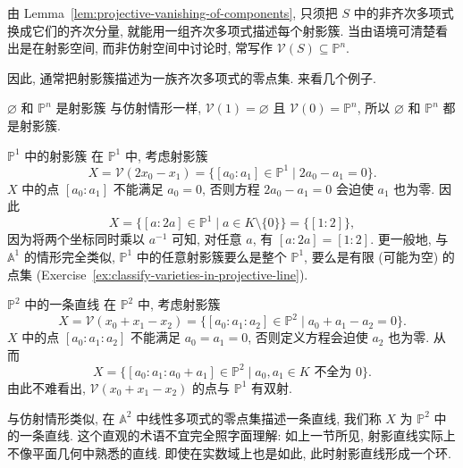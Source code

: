 \begin{BookFlowNote}[l]{%
由 Lemma~\ref{lem:projective-vanishing-of-components}, 只须把 $S$ 中的非齐次多项式换成它们的齐次分量, 就能用一组齐次多项式描述每个射影簇.
}
\noindent 当由语境可清楚看出是在射影空间, 而非仿射空间中讨论时, 常写作 $\mathcal{V}(S)\subseteq\mathbb{P}^{n}$.

因此, 通常把射影簇描述为一族齐次多项式的零点集. 来看几个例子.
\end{BookFlowNote}

\begin{Example}{$\varnothing$ 和 $\mathbb{P}^{n}$ 是射影簇}\leavevmode\label{ex:empty-set-and-projective-space-are-projective-varieties}
与仿射情形一样, $\mathcal{V}(1)=\varnothing$ 且 $\mathcal{V}(0)=\mathbb{P}^{n}$, 所以 $\varnothing$ 和 $\mathbb{P}^{n}$ 都是射影簇.
\end{Example}

\begin{Example}{$\mathbb{P}^{1}$ 中的射影簇}\leavevmode\label{ex:projective-varieties-in-projective-line}
在 $\mathbb{P}^{1}$ 中, 考虑射影簇
\[
  X=\mathcal{V}(2x_{0}-x_{1})
   =\{[a_{0}:a_{1}]\in\mathbb{P}^{1}\mid 2a_{0}-a_{1}=0\}.
\]
$X$ 中的点 $[a_{0}:a_{1}]$ 不能满足 $a_{0}=0$, 否则方程 $2a_{0}-a_{1}=0$ 会迫使 $a_{1}$ 也为零. 因此
\[
  X=\{[a:2a]\in\mathbb{P}^{1}\mid a\in K\setminus\{0\}\}=\{[1:2]\},
\]
因为将两个坐标同时乘以 $a^{-1}$ 可知, 对任意 $a$, 有 $[a:2a]=[1:2]$. 更一般地, 与 $\mathbb{A}^{1}$ 的情形完全类似, $\mathbb{P}^{1}$ 中的任意射影簇要么是整个 $\mathbb{P}^{1}$, 要么是有限 (可能为空) 的点集 (Exercise~\ref{ex:classify-varieties-in-projective-line}).
\end{Example}

\begin{Example}{$\mathbb{P}^{2}$ 中的一条直线}\leavevmode\label{ex:projective-line-in-projective-plane}
在 $\mathbb{P}^{2}$ 中, 考虑射影簇
\[
  X=\mathcal{V}(x_{0}+x_{1}-x_{2})
   =\{[a_{0}:a_{1}:a_{2}]\in\mathbb{P}^{2}\mid a_{0}+a_{1}-a_{2}=0\}.
\]
$X$ 中的点 $[a_{0}:a_{1}:a_{2}]$ 不能满足 $a_{0}=a_{1}=0$, 否则定义方程会迫使 $a_{2}$ 也为零. 从而
\[
  X=\{[a_{0}:a_{1}:a_{0}+a_{1}]\in\mathbb{P}^{2}\mid a_{0},a_{1}\in K\text{ 不全为 }0\}.
\]
由此不难看出, $\mathcal{V}(x_{0}+x_{1}-x_{2})$ 的点与 $\mathbb{P}^{1}$ 有双射.

与仿射情形类似, 在 $\mathbb{A}^{2}$ 中线性多项式的零点集描述一条直线, 我们称 $X$ 为 $\mathbb{P}^{2}$ 中的一条直线. 这个直观的术语不宜完全照字面理解: 如上一节所见, 射影\textquotedbl{}直线\textquotedbl{}实际上不像平面几何中熟悉的直线. 即使在实数域上也是如此, 此时射影直线形成一个环.
\end{Example}


